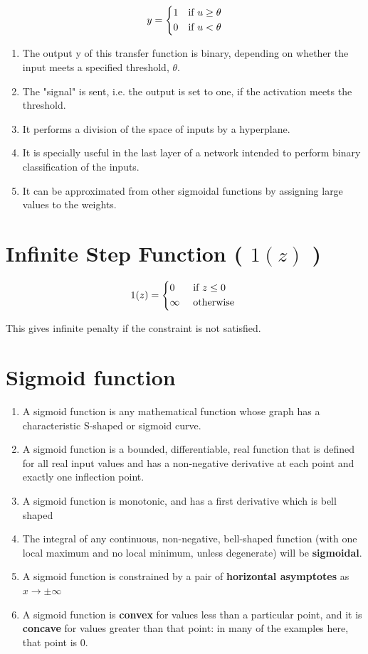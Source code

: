 \[
    y={\begin{dcases}1&{\text{if }}u\geq \theta \\0&{\text{if }}u<\theta \end{dcases}}
\]

\begin{enumerate}
    \item The output y of this transfer function is binary, depending on whether the input meets a specified threshold, $\theta$. 
    \item The "signal" is sent, i.e. the output is set to one, if the activation meets the threshold.
    \item It performs a division of the space of inputs by a hyperplane. 
    \item It is specially useful in the last layer of a network intended to perform binary classification of the inputs. 
    \item It can be approximated from other sigmoidal functions by assigning large values to the weights.
\end{enumerate}

\section{Infinite Step Function ( $1(z)$ )}

\[
    1(z) = {\begin{dcases}
        0 & \text{ if } z \leq 0 \\
        \infty & \text{ otherwise }
    \end{dcases}}
\]

This gives infinite penalty if the constraint is not satisfied.


\section{Sigmoid function \cite{wiki-activation-fn,wiki-Sigmoid_function}} \label{Sigmoid function: broad section}

\begin{enumerate}
    \item A sigmoid function is any mathematical function whose graph has a characteristic S-shaped or sigmoid curve.
    \item A sigmoid function is a bounded, differentiable, real function that is defined for all real input values and has a non-negative derivative at each point and exactly one inflection point.
    \item A sigmoid function is monotonic, and has a first derivative which is bell shaped
    \item The integral of any continuous, non-negative, bell-shaped function (with one local maximum and no local minimum, unless degenerate) will be \textbf{sigmoidal}.
    \item A sigmoid function is constrained by a pair of \textbf{horizontal asymptotes} as $x\rightarrow \pm \infty$
    \item A sigmoid function is \textbf{convex} for values less than a particular point, and it is \textbf{concave} for values greater than that point: in many of the examples here, that point is 0.
\end{enumerate}

